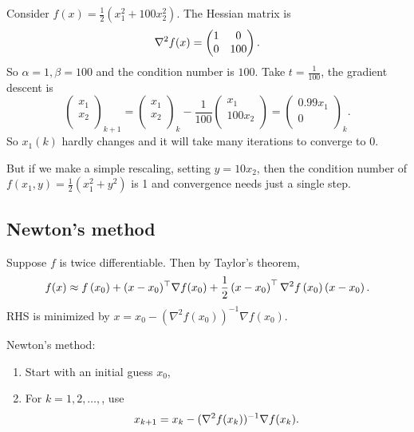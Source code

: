 \begin{example}
    Consider $ f(x) = \frac{1}{2} (x_1^2 + 100 x_2^2) $. The Hessian matrix is 
    \[
        \nabla^2 f(x) = \begin{pmatrix}
            1 &  0 \\
            0 &  100 \\
        \end{pmatrix}. 
    \]
    So $ \alpha=1,\beta=100 $ and the condition number is $100$. Take $ t = \frac{1}{100} $, the gradient descent is 
    \[
        \begin{pmatrix}
             x_1 \\
             x_2 \\
        \end{pmatrix}_{k+1} = \begin{pmatrix}
             x_1 \\
             x_2 \\
        \end{pmatrix}_{k} - \frac{1}{100} \begin{pmatrix}
             x_1 \\
             100 x_2 \\
        \end{pmatrix} = \begin{pmatrix}
             0.99 x_1 \\
             0 \\
        \end{pmatrix}_{k}.
    \]
    So $x_1(k)$ hardly changes and it will take many iterations to converge to 0.

    But if we make a simple rescaling, setting $y=10 x_2$, then the condition number of $f\left(x_1, y\right)=\frac{1}{2}\left(x_1^2+y^2\right)$ is 1 and convergence needs just a single step.
\end{example}

\subsection{Newton's method}
Suppose $f$ is twice differentiable. Then by Taylor's theorem, 
\[
f(x) \approx f\left(x_0\right)+(x-x_0)^\top\nabla f(x_0)+\frac{1}{2}\left(x-x_0\right)^{\top} \nabla^2 f\left(x_0\right)\left(x-x_0\right) .
\]
RHS is minimized by $x=x_0-\left(\nabla^2 f\left(x_0\right)\right)^{-1} \nabla f\left(x_0\right)$.

Newton's method:
\begin{framed}
    \begin{enumerate}
        \item Start with an initial guess $x_0$,
        \item For $k=1,2,\dots,$, use 
        \[
            x_{k+1} = x_k - (\nabla^2 f(x_k)) ^{-1} \nabla f(x_k). 
        \]
    \end{enumerate}
\end{framed}

